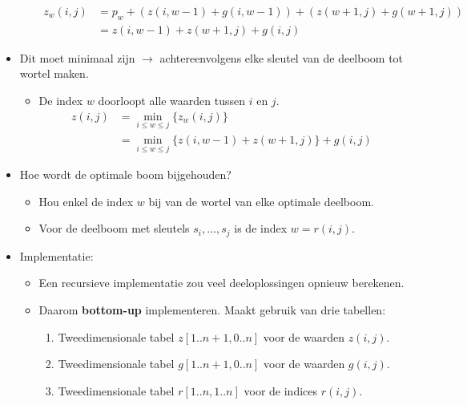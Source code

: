 \begin{itemize}
\begin{itemize}
        \begin{align*}
            z_w(i, j) & = p_w + (z(i, w - 1) + g(i, w - 1)) + (z(w + 1, j) + g(w + 1, j)) \\
                      & = z(i , w - 1) + z(w + 1, j) + g(i, j)
        \end{align*}
    \end{itemize}
    \item Dit moet minimaal zijn $\rightarrow$ achtereenvolgens elke sleutel van de deelboom tot wortel maken.
    \begin{itemize}
        \item De index $w$ doorloopt alle waarden tussen $i$ en $j$.
        \begin{align*}
            z(i, j) & = \min_{i \leq w \leq j} \{ z_w(i, j)\} \\
                    & = \min_{i \leq w \leq j} \{ z(i , w - 1) + z(w + 1, j)\}  + g(i, j)
        \end{align*}
    \end{itemize}
    \item Hoe wordt de optimale boom bijgehouden?
    \begin{itemize}
        \item Hou enkel de index $w$ bij van de wortel van elke optimale deelboom.
        \item Voor de deelboom met sleutels $s_i, \dots, s_j$ is  de index $w = r(i, j)$.
    \end{itemize}
    \item Implementatie:
    \begin{itemize}
        \item Een recursieve implementatie zou veel deeloplossingen opnieuw berekenen.
        \item Daarom \textbf{bottom-up} implementeren. Maakt gebruik van drie tabellen:
        \begin{enumerate}
            \item Tweedimensionale tabel $z[1..n + 1, 0..n]$ voor de waarden $z(i, j)$.
            \item Tweedimensionale tabel $g[1..n + 1, 0..n]$ voor de waarden $g(i, j)$.
            \item Tweedimensionale tabel $r[1..n, 1..n]$ voor de indices $r(i, j)$.
            

\end{enumerate}
\end{itemize}
\end{itemize}
